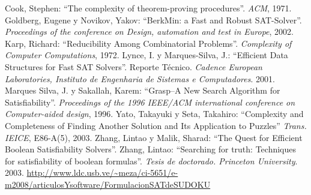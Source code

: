\documentclass[12pt,lettersize,oneside]{article}
\begin{document}
\begin{thebibliography}{99}
Cook, Stephen: ``The complexity of theorem-proving
  procedures''. \emph{ACM}, 1971.
 Goldberg, Eugene y Novikov, Yakov: ``BerkMin: a Fast and
  Robust SAT-Solver''. \emph{Proceedings of the conference on Design, automation
    and test in Europe}, 2002.
Karp, Richard: ``Reducibility Among Combinatorial
  Problems''. \emph{Complexity of Computer Computations}, 1972.
Lynce, I. y Marques-Silva, J.: ``Efficient Data Structures for
  Fast SAT Solvers''. Reporte Técnico. \emph{Cadence European Laboratories,
    Instituto de Engenharia de Sistemas e Computadores}. 2001.
Marques Silva, J. y Sakallah, Karem: ``Grasp--A New Search
  Algorithm for Satisfiability''. \emph{Proceedings of the 1996 IEEE/ACM
    international conference on Computer-aided design}, 1996.
Yato, Takayuki y Seta, Takahiro: ``Complexity and Completeness
  of Finding Another Solution and Its Application to Puzzles''  \emph{Trans. IEICE}, E86-A(5), 2003.
Zhang, Lintao y Malik, Sharad: ``The Quest for Efficient Boolean
  Satisfiability Solvers''.
Zhang, Lintao: ``Searching for truth: Techniques for
  satisfiability of boolean formulas''. \emph{Tesis de doctorado. Princeton
    University}. 2003.
\url{http://www.ldc.usb.ve/~meza/ci-5651/e-m2008/articulosYsoftware/FormulacionSATdeSUDOKU}
\end{thebibliography}
\end{document}
